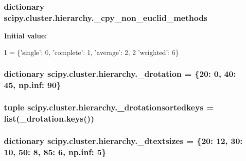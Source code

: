 \subsubsection[{\+\_\+cpy\+\_\+non\+\_\+euclid\+\_\+methods}]{\setlength{\rightskip}{0pt plus 5cm}dictionary scipy.\+cluster.\+hierarchy.\+\_\+cpy\+\_\+non\+\_\+euclid\+\_\+methods}\label{namespacescipy_1_1cluster_1_1hierarchy_a08000610cd9218a42e8e775811ac3116}
{\bfseries Initial value\+:}
\begin{DoxyCode}
1 = \{\textcolor{stringliteral}{'single'}: 0, \textcolor{stringliteral}{'complete'}: 1, \textcolor{stringliteral}{'average'}: 2,
2                            \textcolor{stringliteral}{'weighted'}: 6\}
\end{DoxyCode}
\hypertarget{namespacescipy_1_1cluster_1_1hierarchy_adc156b5164b7d8ba3654b3f0bc5a41f4}{}
\subsubsection[{\+\_\+drotation}]{\setlength{\rightskip}{0pt plus 5cm}dictionary scipy.\+cluster.\+hierarchy.\+\_\+drotation = \{20\+: 0, 40\+: 45, np.\+inf\+: 90\}}\label{namespacescipy_1_1cluster_1_1hierarchy_adc156b5164b7d8ba3654b3f0bc5a41f4}
\hypertarget{namespacescipy_1_1cluster_1_1hierarchy_af1462efdb7ea8807e2bc726e282832d1}{}
\subsubsection[{\+\_\+drotationsortedkeys}]{\setlength{\rightskip}{0pt plus 5cm}tuple scipy.\+cluster.\+hierarchy.\+\_\+drotationsortedkeys = list(\+\_\+drotation.\+keys())}\label{namespacescipy_1_1cluster_1_1hierarchy_af1462efdb7ea8807e2bc726e282832d1}
\hypertarget{namespacescipy_1_1cluster_1_1hierarchy_a70c2ab570be16641c7a6c6b8c9888a01}{}
\subsubsection[{\+\_\+dtextsizes}]{\setlength{\rightskip}{0pt plus 5cm}dictionary scipy.\+cluster.\+hierarchy.\+\_\+dtextsizes = \{20\+: 12, 30\+: 10, 50\+: 8, 85\+: 6, np.\+inf\+: 5\}}\label{namespacescipy_1_1cluster_1_1hierarchy_a70c2ab570be16641c7a6c6b8c9888a01}
\hypertarget{namespacescipy_1_1cluster_1_1hierarchy_a7261f809976b2b79252f0c9119182b4f}{}
